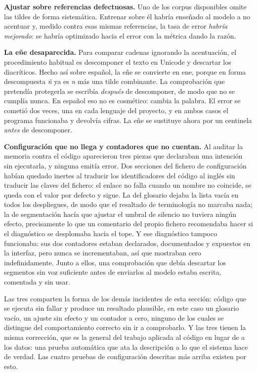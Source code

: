 \textbf{Ajustar sobre referencias defectuosas.} Uno de los corpus disponibles omite las
tildes de forma sistemática. Entrenar sobre él habría enseñado al modelo a no acentuar y,
medido contra esas mismas referencias, la tasa de error \emph{habría mejorado}: se habría
optimizado hacia el error con la métrica dando la razón.

\textbf{La eñe desaparecida.} Para comparar cadenas ignorando la acentuación, el
procedimiento habitual es descomponer el texto en Unicode y descartar los diacríticos. Hecho
así sobre español, la eñe se convierte en ene, porque en forma descompuesta \emph{ñ} ya es
\emph{n} más una tilde combinante. La comprobación que pretendía protegerla se escribía
\emph{después} de descomponer, de modo que no se cumplía nunca. En español eso no es
cosmético: cambia la palabra. El error se cometió dos veces, una en cada lenguaje del
proyecto, y en ambos casos el programa funcionaba y devolvía cifras. La eñe se sustituye
ahora por un centinela \emph{antes} de descomponer.

\textbf{Configuración que no llega y contadores que no cuentan.} Al auditar la memoria
contra el código aparecieron tres piezas que declaraban una intención sin ejecutarla, y
ninguna emitía error. Dos secciones del fichero de configuración habían quedado inertes al
traducir los identificadores del código al inglés sin traducir las claves del fichero: el
enlace no falla cuando un nombre no coincide, se queda con el valor por defecto y sigue. La
del glosario dejaba la lista vacía en todos los despliegues, de modo que el resaltado de
terminología no marcaba nada; la de segmentación hacía que ajustar el umbral de silencio no
tuviera ningún efecto, precisamente lo que un comentario del propio fichero recomendaba
hacer si el diagnóstico se desplomaba hacia el tope. Y ese diagnóstico tampoco funcionaba:
sus dos contadores estaban declarados, documentados y expuestos en la interfaz, pero nunca
se incrementaban, así que mostraban cero indefinidamente. Junto a ellos, una comprobación
que debía descartar los segmentos sin voz suficiente antes de enviarlos al modelo estaba
escrita, comentada y sin usar.

Las tres comparten la forma de los demás incidentes de esta sección: código que se ejecuta
sin fallar y produce un resultado plausible, en este caso un glosario vacío, un ajuste sin
efecto y un contador a cero, ninguno de los cuales se distingue del comportamiento
correcto sin ir a comprobarlo. Y las tres tienen la misma corrección, que es la general del
trabajo aplicada al código en lugar de a los datos: una prueba automática que ata la
descripción a lo que el sistema hace de verdad. Las cuatro pruebas de configuración
descritas más arriba existen por esto.

